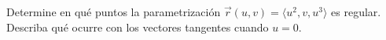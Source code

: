 Determine en qué puntos la parametrización $\vec r(u,v)=\langle u^2,v,u^3\rangle$ es regular. Describa qué ocurre con los vectores tangentes cuando $u=0$.

